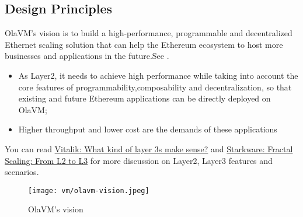 \subsection{Design Principles} \label{sec:design-principles-2}

OlaVM's vision is to build a high-performance, programmable and decentralized Ethernet scaling solution that can help the Ethereum ecosystem to
host more businesses and applications in the future.See .
\begin{itemize}
    \item As Layer2, it needs to achieve high performance while taking into account the core features of programmability,composability and
          decentralization, so that existing and future Ethereum applications can be directly deployed on OlaVM;
    \item Higher throughput and lower cost are the demands of these applications
\end{itemize}
You can read \href{https://vitalik.ca/general/2022/09/17/layer_3.html}{Vitalik: What kind of layer 3s make sense?} and
\href{https://medium.com/starkware/fractal-scaling-from-l2-to-l3-7fe238ecfb4f}{Starkware: Fractal Scaling: From L2 to L3} for more discussion
on Layer2, Layer3 features and scenarios.

\begin{figure}[!ht]
    \centering
    \texttt{[image: vm/olavm-vision.jpeg]}
    \caption{OlaVM's vision}
    \label{fig:olavm-vision}
\end{figure}




